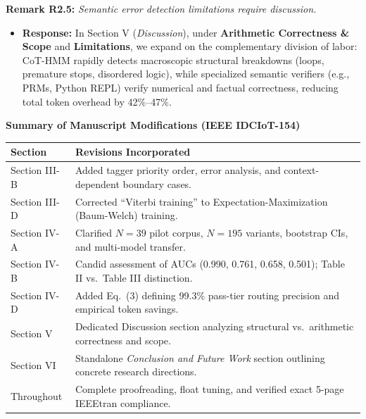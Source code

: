 \documentclass[11pt,a4paper]{article}
\begin{document}
\vspace{6pt}
\noindent\textbf{Remark R2.5:} \textit{Semantic error detection limitations require discussion.}
\begin{itemize}[leftmargin=18pt]
    \item \textbf{Response:} In Section V (\textit{Discussion}), under \textbf{Arithmetic Correctness \& Scope} and \textbf{Limitations}, we expand on the complementary division of labor: CoT-HMM rapidly detects macroscopic structural breakdowns (loops, premature stops, disordered logic), while specialized semantic verifiers (e.g., PRMs, Python REPL) verify numerical and factual correctness, reducing total token overhead by 42\%--47\%.
\end{itemize}

\vspace{12pt}
\begin{center}
\textbf{Summary of Manuscript Modifications (IEEE IDCIoT-154)}
\vspace{4pt}

\begin{tabular}{lp{10.5cm}}
\toprule
\textbf{Section} & \textbf{Revisions Incorporated} \\
\midrule
Section III-B & Added tagger priority order, error analysis, and context-dependent boundary cases. \\
Section III-D & Corrected ``Viterbi training'' to Expectation-Maximization (Baum-Welch) training. \\
Section IV-A & Clarified $N=39$ pilot corpus, $N=195$ variants, bootstrap CIs, and multi-model transfer. \\
Section IV-B & Candid assessment of AUCs (0.990, 0.761, 0.658, 0.501); Table II vs.\ Table III distinction. \\
Section IV-D & Added Eq.~(3) defining 99.3\% pass-tier routing precision and empirical token savings. \\
Section V & Dedicated Discussion section analyzing structural vs.\ arithmetic correctness and scope. \\
Section VI & Standalone \textit{Conclusion and Future Work} section outlining concrete research directions. \\
Throughout & Complete proofreading, float tuning, and verified exact 5-page IEEEtran compliance. \\
\bottomrule
\end{tabular}
\end{center}
\end{document}
